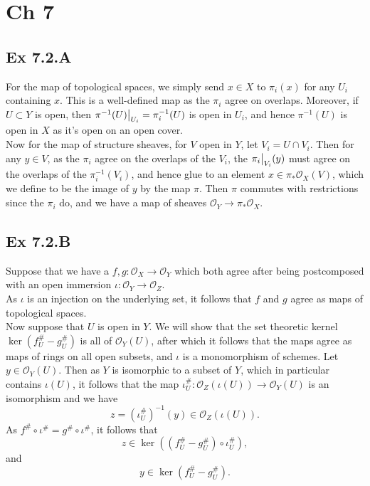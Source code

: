 \documentclass{article}
\newcommand\restr[2]{{%
  \left.\kern-\nulldelimiterspace %
  #1 %
  \vphantom{\big|} %
  \right|_{#2} %
  }}
\theoremstyle{definition}
\begin{document}
\section*{Ch 7}

\subsection*{Ex 7.2.A}

For the map of topological spaces, we simply send $x \in X$ to $\pi_i(x)$ for
any $U_i$ containing $x$. This is a well-defined map as the $\pi_i$ agree on
overlaps. Moreover, if $U \subset Y$ is open, then $\restr{\pi^{-1}(U)}{U_i} =
	\pi_i^{-1}(U)$ is open in $U_i$, and hence $\pi^{-1}(U)$ is open in $X$ as it's
open on an open cover. \\

Now for the map of structure sheaves, for $V$ open in $Y$, let $V_i = U \cap
	V_i$. Then for any $y \in V$, as the $\pi_i$ agree on the overlaps of the
$V_i$, the $\restr{\pi_i}{V_i}(y)$ must agree on the overlaps of the
$\pi_i^{-1}(V_i)$, and hence glue to an element $x \in
	\pi_{*}\mathcal{O}_{X}(V)$, which we define to be the image of $y$ by the map
$\pi$. Then $\pi$ commutes with restrictions since the $\pi_i$ do, and we have
a map of sheaves $\mathcal{O}_Y \to \pi_{*}\mathcal{O}_X$.

\subsection*{Ex 7.2.B}

Suppose that we have a $f, g : \mathcal{O}_X \to \mathcal{O}_Y$
which both agree after being postcomposed with an open immersion
$\iota : \mathcal{O}_Y \to \mathcal{O}_Z$. \\

As $\iota$ is an injection on the underlying set, it follows that $f$ and $g$
agree as maps of topological spaces. \\

Now suppose that $U$ is open in $Y$. We will show that the set theoretic kernel
$\ker(f^{\#}_U - g^{\#}_U)$ is all of $\mathcal{O}_Y(U)$, after which it
follows that the maps agree as maps of rings on all open subsets, and $\iota$
is a monomorphism of schemes. Let $y \in \mathcal{O}_Y(U)$. Then as $Y$
is isomorphic to a subset of $Y$, which in particular contains $\iota(U)$,
it follows that the map $\iota^{\#}_U : \mathcal{O}_Z(\iota(U)) \to \mathcal{O}_Y(U)$
is an isomorphism and we have
\[
	z = \left(\iota^{\#}_U\right)^{-1}(y)  \in \mathcal{O}_Z(\iota(U)).
\]
As $f^{\#} \circ \iota^{\#} = g^{\#} \circ \iota^{\#}$, it follows that
\[
	z \in \ker\left(\left(f^{\#}_U - g^{\#}_U\right) \circ \iota^{\#}_U\right),
\]
and
\[
	y \in \ker\left(f^{\#}_U - g^{\#}_U\right).
\]
\end{document}
